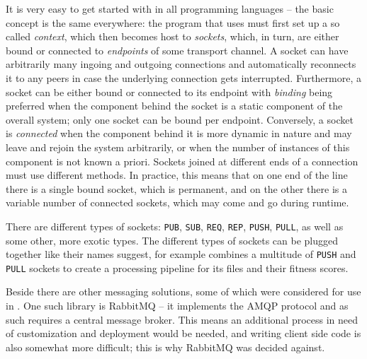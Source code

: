 It is very easy to get started with \zmq in all programming languages -- the basic concept is the
same everywhere: the program that uses \zmq must first set up a so called \emph{context}, which then becomes
host to \emph{sockets}, which, in turn, are either bound or connected to \emph{endpoints} of some transport
channel. A socket can have arbitrarily many ingoing and outgoing connections and \zmq automatically reconnects
it to any peers in case the underlying connection gets interrupted. Furthermore, a socket can be either bound
or connected to its endpoint with \emph{binding} being preferred when the component behind the socket is a
static component of the overall system; only one socket can be bound per endpoint. Conversely, a socket is
\emph{connected} when the component behind it is more dynamic in nature and may leave and rejoin the system
arbitrarily, or when the number of instances of this component is not known a priori. Sockets joined at
different ends of a connection must use different methods. In practice, this means that on one end of the line
there is a single bound socket, which is permanent, and on the other there is a variable number of connected
sockets, which may come and go during runtime.

There are different types of sockets: \texttt{PUB}, \texttt{SUB}, \texttt{REQ}, \texttt{REP}, \texttt{PUSH}, 
\texttt{PULL}, as well as some other, more exotic types. The different types of sockets can be plugged together
like their names suggest, for example \xmlmate combines a multitude of \texttt{PUSH} and \texttt{PULL} sockets
to create a processing pipeline for its \xml files and their fitness scores.

Beside \zmq there are other messaging solutions, some of which were considered for use in \xmlmate. One such
library is RabbitMQ\cite{rabbitmq} -- it implements the AMQP protocol and as such requires a central
message broker. This means an additional process in need of customization and deployment would be needed, and
writing client side code is also somewhat more difficult; this is why RabbitMQ was decided against.

